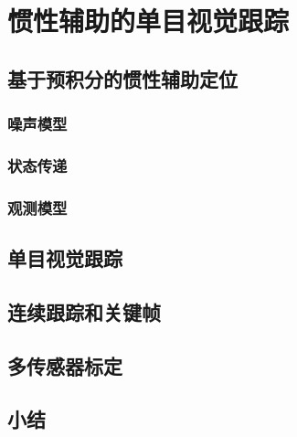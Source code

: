 \chapter{惯性辅助的单目视觉跟踪}

\section{基于预积分的惯性辅助定位}
\subsection{噪声模型}
\subsection{状态传递}
\subsection{观测模型}

\section{单目视觉跟踪}

\section{连续跟踪和关键帧}

\section{多传感器标定}

\section{小结}
